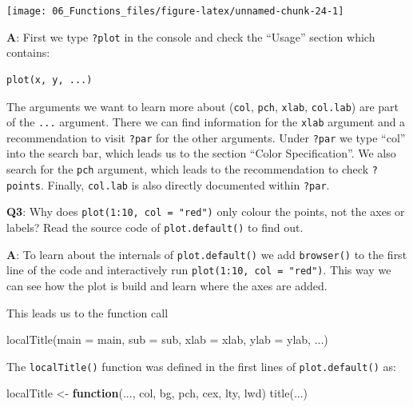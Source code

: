 \documentclass[
]{krantz}
\makeatletter
\newenvironment{Shaded}{\begin{snugshade}}{\end{snugshade}}
\newcommand{\ControlFlowTok}[1]{\textcolor[rgb]{0.13,0.29,0.53}{\textbf{#1}}}
\newcommand{\DataTypeTok}[1]{\textcolor[rgb]{0.13,0.29,0.53}{#1}}
\newcommand{\KeywordTok}[1]{\textcolor[rgb]{0.13,0.29,0.53}{\textbf{#1}}}
\newcommand{\NormalTok}[1]{#1}
\newcommand{\StringTok}[1]{\textcolor[rgb]{0.31,0.60,0.02}{#1}}
\newenvironment{kframe}{%
\medskip{}
\setlength{\fboxsep}{.8em}
 \def\at@end@of@kframe{}%
 \ifinner\ifhmode%
  \def\at@end@of@kframe{\end{minipage}}%
  \begin{minipage}{\columnwidth}%
 \fi\fi%
 \def\FrameCommand##1{\hskip\@totalleftmargin \hskip-\fboxsep
 \colorbox{shadecolor}{##1}\hskip-\fboxsep
     \hskip-\linewidth \hskip-\@totalleftmargin \hskip\columnwidth}%
 \MakeFramed {\advance\hsize-\width
   \@totalleftmargin\z@ \linewidth\hsize
   \@setminipage}}%
 {\par\unskip\endMakeFramed%
 \at@end@of@kframe}
\renewenvironment{Shaded}{\begin{kframe}}{\end{kframe}}
\renewcommand{\KeywordTok} [1]{\textcolor[rgb]{0.00,0.44,0.13}{{#1}}}
\renewcommand{\DataTypeTok}[1]{\textcolor[rgb]{0.56,0.13,0.00}{{#1}}}
\renewcommand{\StringTok}  [1]{\textcolor[rgb]{0.25,0.44,0.63}{{#1}}}
\renewcommand{\NormalTok}  [1]{{#1}}
\makeatother
\begin{document}
\begin{center}\texttt{[image: 06\_Functions\_files/figure-latex/unnamed-chunk-24-1]} \end{center}

\textbf{{A}}: First we type \texttt{?plot} in the console and check the ``Usage'' section which contains:

\begin{verbatim}
plot(x, y, ...)
\end{verbatim}

The arguments we want to learn more about (\texttt{col}, \texttt{pch}, \texttt{xlab}, \texttt{col.lab}) are part of the \texttt{...} argument. There we can find information for the \texttt{xlab} argument and a recommendation to visit \texttt{?par} for the other arguments. Under \texttt{?par} we type ``col'' into the search bar, which leads us to the section ``Color Specification''. We also search for the \texttt{pch} argument, which leads to the recommendation to check \texttt{?points}. Finally, \texttt{col.lab} is also directly documented within \texttt{?par}.

\textbf{{Q3}}: Why does \texttt{plot(1:10,\ col\ =\ "red")} only colour the points, not the axes or labels? Read the source code of \texttt{plot.default()} to find out.

\textbf{{A}}: To learn about the internals of \texttt{plot.default()} we add \texttt{browser()} to the first line of the code and interactively run \texttt{plot(1:10,\ col\ =\ "red")}. This way we can see how the plot is build and learn where the axes are added.

This leads us to the function call

\begin{Shaded}
\begin{Highlighting}[]
\KeywordTok{localTitle}\NormalTok{(}\DataTypeTok{main =}\NormalTok{ main, }\DataTypeTok{sub =}\NormalTok{ sub, }\DataTypeTok{xlab =}\NormalTok{ xlab, }\DataTypeTok{ylab =}\NormalTok{ ylab, ...)}
\end{Highlighting}
\end{Shaded}

The \texttt{localTitle()} function was defined in the first lines of \texttt{plot.default()} as:

\begin{Shaded}
\begin{Highlighting}[]
\NormalTok{localTitle <-}\StringTok{ }\ControlFlowTok{function}\NormalTok{(..., col, bg, pch, cex, lty, lwd) }\KeywordTok{title}\NormalTok{(...)}
\end{Highlighting}
\end{Shaded}
\end{document}
